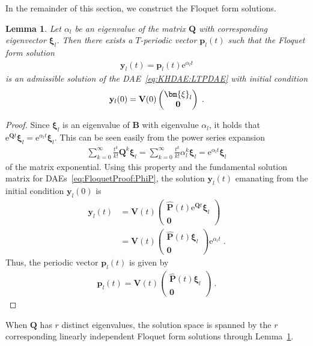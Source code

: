 \documentclass[a4paper, nonatbib, 3p, twocolumn]{elsarticle}
\theoremstyle{plain}
\newtheorem{lemma}[theorem]{Lemma}
\theoremstyle{definition}
\theoremstyle{remark}
\newcommand{\ex}{\re} %
\newcommand{\vzero}{\mathbf{0}}
\newcommand{\re}{\mathrm e}
\newcommand{\vxi}{\bm{\xi}}
\newcommand{\vp}{\mathbf p}
\newcommand{\vy}{\mathbf y}
\newcommand{\vB}{\mathbf B}
\newcommand{\vP}{\mathbf P}
\newcommand{\vQ}{\mathbf Q}
\newcommand{\vV}{\mathbf V}
\begin{document}
In the remainder of this section, we construct the Floquet form solutions. 
\begin{lemma}\label{lem:floquetform}
    Let $\alpha_l$ be an eigenvalue of the matrix $\vQ$ with corresponding eigenvector $\vxi_l$. Then there exists a $T$-periodic vector $\vp_l(t)$ such that the Floquet form solution
    \begin{align}
        \vy_l(t) = \vp_l(t) \ex^{\alpha_l t}
    \end{align}
    is an admissible solution of the DAE~\eqref{eq:KHDAE:LTPDAE} with initial condition
    \begin{align}
        \vy_l(0) = \vV(0) \begin{pmatrix}
            \vxi_l\\ \vzero
        \end{pmatrix}\;\textnormal{.}
    \end{align} 
\end{lemma}
\begin{proof}
    Since $\vxi_l$ is an eigenvalue of $\vB$ with eigenvalue $\alpha_l$, it holds that $\ex^{\vQ t} \vxi_l = \ex^{\alpha_l t} \vxi_l$. This can be seen easily from the power series expansion
    \begin{align}
        \sum_{k=0}^\infty \frac{t^k}{k!} \vQ^k \vxi_l = \sum_{k=0}^\infty \frac{t^k}{k!} \alpha_l^k \vxi_l = \ex^{\alpha_l t} \vxi_l
    \end{align}
    of the matrix exponential.
    Using this property and the fundamental solution matrix for DAEs~\eqref{eq:FloquetProof:PhiP}, the solution $\vy_l(t)$ emanating from the initial condition $\vy_l(0)$ is 
    \begin{align}
        \vy_l(t) &=  \vV(t) \begin{pmatrix}
            \hat{\vP}(t) \ex^{\vQ t} \vxi_l \\ \vzero 
        \end{pmatrix} \nonumber\\
        &=
        \vV(t) \begin{pmatrix}
            \hat{\vP}(t) \vxi_l \\\vzero
        \end{pmatrix} \ex^{\alpha_l t} \;.
    \end{align}
    Thus, the periodic vector $\vp_l(t)$ is given by 
    \begin{align}
        \vp_l(t) = \vV(t) \begin{pmatrix}
            \hat{\vP}(t) \vxi_l \\ \vzero
        \end{pmatrix} \;.
    \end{align}
\end{proof}
When $\vQ$ has $r$ distinct eigenvalues, the solution space is spanned by the $r$ corresponding linearly independent Floquet form solutions through Lemma~\ref{lem:floquetform}. 

% 
% 

\end{document}
